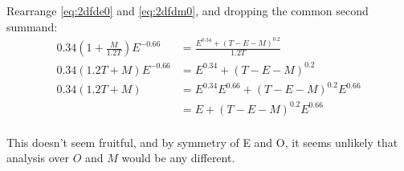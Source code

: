 \documentclass{article}
\begin{document}
Rearrange \eqref{eq:2dfde0} and \eqref{eq:2dfdm0}, and dropping the common second summand:
\begin{equation}\label{eq:2dfde0r}
  \begin{split}
    0.34\left( 1 + \frac{M}{1.2 T} \right)E^{-0.66} & = \frac{E^{0.34} + \left( T - E - M \right)^{0.2}}{1.2 T} \\
    0.34\left(1.2T + M\right)E^{-0.66} & = E^{0.34} + \left( T - E - M \right)^{0.2} \\
    0.34\left(1.2T + M\right) & = E^{0.34}E^{0.66} + \left( T - E - M \right)^{0.2}E^{0.66} \\
    & = E + \left( T - E - M \right)^{0.2}E^{0.66} \\
  \end{split}
\end{equation}

This doesn't seem fruitful, and by symmetry of E and O, it seems unlikely that analysis over $O$ and $M$ would be any different.
\end{document}
